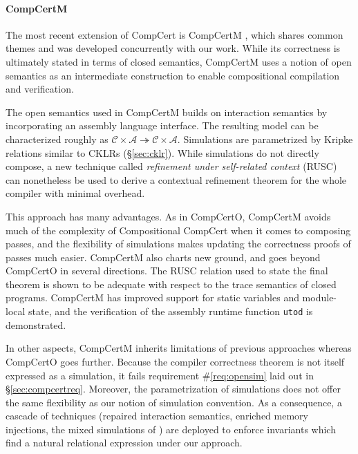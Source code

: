 \documentclass[sigplan,screen]{acmart}
\begin{document}

\paragraph{CompCertM} %

The most recent extension of CompCert is CompCertM \cite{compcertm},
which shares common themes and was developed concurrently
with our work.
While its correctness
is ultimately stated in terms of closed semantics,
CompCertM uses a notion of open semantics
as an intermediate construction
to enable compositional compilation and verification.

The open semantics used in CompCertM
builds on interaction semantics
by incorporating an assembly language interface.
The resulting model can be characterized roughly as
$\mathcal{C} \times \mathcal{A} \twoheadrightarrow
 \mathcal{C} \times \mathcal{A}$.
Simulations
are parametrized by Kripke relations similar to CKLRs (\S\ref{sec:cklr}).
While simulations do not directly compose,
a new technique called \emph{refinement under self-related context}
(RUSC)
can nonetheless be used to derive a contextual refinement theorem
for the whole compiler with minimal overhead.

This approach has many advantages.
As in CompCertO,
CompCertM avoids much of the complexity
of Compositional CompCert
when it comes to composing passes,
and the flexibility of simulations
makes updating the correctness proofs of passes much easier.
CompCertM also charts new ground,
and goes beyond CompCertO
in several directions.
The RUSC relation used to state the final theorem
is shown to be adequate with respect to the trace semantics
of closed programs.
CompCertM has improved support for static variables
and module-local state,
and the verification of
the assembly runtime function \texttt{utod} is demonstrated.

In other aspects, CompCertM inherits limitations of previous
approaches whereas CompCertO goes further.  Because the compiler
correctness theorem is not itself expressed as a simulation, it fails
requirement \#\ref{req:opensim} laid out in \S\ref{sec:compcertreq}.
Moreover, the parametrization of simulations does not offer the same
flexibility as our notion of simulation convention.  As a
consequence, a cascade of techniques (repaired interaction
semantics, enriched memory injections, the mixed simulations of
\citet{pilsner}) are deployed to enforce invariants which find a
natural relational expression under our approach.
\end{document}
